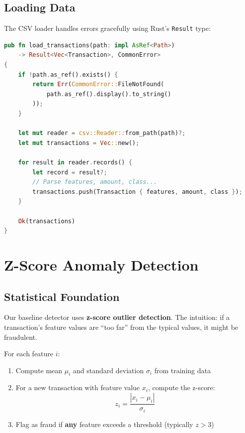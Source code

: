 \subsection{Loading Data}

The CSV loader handles errors gracefully using Rust's \texttt{Result} type:

\begin{lstlisting}[language=Rust]
pub fn load_transactions(path: impl AsRef<Path>)
    -> Result<Vec<Transaction>, CommonError>
{
    if !path.as_ref().exists() {
        return Err(CommonError::FileNotFound(
            path.as_ref().display().to_string()
        ));
    }

    let mut reader = csv::Reader::from_path(path)?;
    let mut transactions = Vec::new();

    for result in reader.records() {
        let record = result?;
        // Parse features, amount, class...
        transactions.push(Transaction { features, amount, class });
    }

    Ok(transactions)
}
\end{lstlisting}

\section{Z-Score Anomaly Detection}

\subsection{Statistical Foundation}


Our baseline detector uses \textbf{z-score outlier detection}. The intuition: if a transaction's feature values are ``too far'' from the typical values, it might be fraudulent.

For each feature $i$:
\begin{enumerate}
    \item Compute mean $\mu_i$ and standard deviation $\sigma_i$ from training data
    \item For a new transaction with feature value $x_i$, compute the z-score:
    \[z_i = \frac{|x_i - \mu_i|}{\sigma_i}\]
    \item Flag as fraud if \textbf{any} feature exceeds a threshold (typically $z > 3$)
\end{enumerate}

